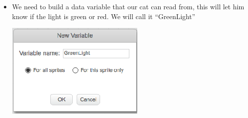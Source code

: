 \documentclass[12pt]{article}
\begin{document}
\begin{itemize}
\begin{center}
		\end{center}
		\item We need to build a data variable that our cat can read from, this will let him know if the light is green or red.  We will call it “GreenLight”
		\begin{center}
			\includegraphics[scale=.50]{./Images/image4}
		\end{center}
		

\end{itemize}
\end{document}
